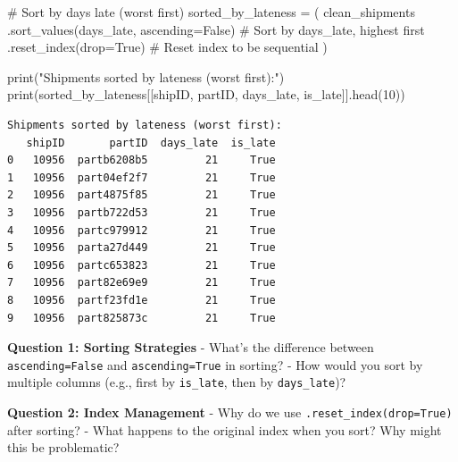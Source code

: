 \documentclass[
  letterpaper,
  DIV=11,
  numbers=noendperiod]{scrartcl}
\newenvironment{Shaded}{\begin{snugshade}}{\end{snugshade}}
\newcommand{\BuiltInTok}[1]{\textcolor[rgb]{0.00,0.23,0.31}{#1}}
\newcommand{\CommentTok}[1]{\textcolor[rgb]{0.37,0.37,0.37}{#1}}
\newcommand{\DecValTok}[1]{\textcolor[rgb]{0.68,0.00,0.00}{#1}}
\newcommand{\NormalTok}[1]{\textcolor[rgb]{0.00,0.23,0.31}{#1}}
\newcommand{\OperatorTok}[1]{\textcolor[rgb]{0.37,0.37,0.37}{#1}}
\newcommand{\StringTok}[1]{\textcolor[rgb]{0.13,0.47,0.30}{#1}}
\newcommand{\VariableTok}[1]{\textcolor[rgb]{0.07,0.07,0.07}{#1}}
\begin{document}
\label{mental-model-4-sort}
\begin{Shaded}
\begin{Highlighting}[]
\CommentTok{\# Sort by days late (worst first)}
\NormalTok{sorted\_by\_lateness }\OperatorTok{=}\NormalTok{ (}
\NormalTok{    clean\_shipments}
\NormalTok{    .sort\_values(}\StringTok{\textquotesingle{}days\_late\textquotesingle{}}\NormalTok{, ascending}\OperatorTok{=}\VariableTok{False}\NormalTok{)  }\CommentTok{\# Sort by days\_late, highest first}
\NormalTok{    .reset\_index(drop}\OperatorTok{=}\VariableTok{True}\NormalTok{)  }\CommentTok{\# Reset index to be sequential}
\NormalTok{)}

\BuiltInTok{print}\NormalTok{(}\StringTok{"Shipments sorted by lateness (worst first):"}\NormalTok{)}
\BuiltInTok{print}\NormalTok{(sorted\_by\_lateness[[}\StringTok{\textquotesingle{}shipID\textquotesingle{}}\NormalTok{, }\StringTok{\textquotesingle{}partID\textquotesingle{}}\NormalTok{, }\StringTok{\textquotesingle{}days\_late\textquotesingle{}}\NormalTok{, }\StringTok{\textquotesingle{}is\_late\textquotesingle{}}\NormalTok{]].head(}\DecValTok{10}\NormalTok{))}
\end{Highlighting}
\end{Shaded}

\begin{verbatim}
Shipments sorted by lateness (worst first):
   shipID       partID  days_late  is_late
0   10956  partb6208b5         21     True
1   10956  part04ef2f7         21     True
2   10956  part4875f85         21     True
3   10956  partb722d53         21     True
4   10956  partc979912         21     True
5   10956  parta27d449         21     True
6   10956  partc653823         21     True
7   10956  part82e69e9         21     True
8   10956  partf23fd1e         21     True
9   10956  part825873c         21     True
\end{verbatim}

\begin{tcolorbox}[enhanced jigsaw, bottomtitle=1mm, opacitybacktitle=0.6, toptitle=1mm, colbacktitle=quarto-callout-important-color!10!white, breakable, coltitle=black, bottomrule=.15mm, left=2mm, colframe=quarto-callout-important-color-frame, colback=white, title=\textcolor{quarto-callout-important-color}{\faExclamation}\hspace{0.5em}{🤔 Discussion Questions: Sort Mental Model}, leftrule=.75mm, arc=.35mm, rightrule=.15mm, opacityback=0, toprule=.15mm, titlerule=0mm]

\textbf{Question 1: Sorting Strategies} - What's the difference between
\texttt{ascending=False} and \texttt{ascending=True} in sorting? - How
would you sort by multiple columns (e.g., first by \texttt{is\_late},
then by \texttt{days\_late})?

\textbf{Question 2: Index Management} - Why do we use
\texttt{.reset\_index(drop=True)} after sorting? - What happens to the
original index when you sort? Why might this be problematic?

\end{tcolorbox}
\end{document}
